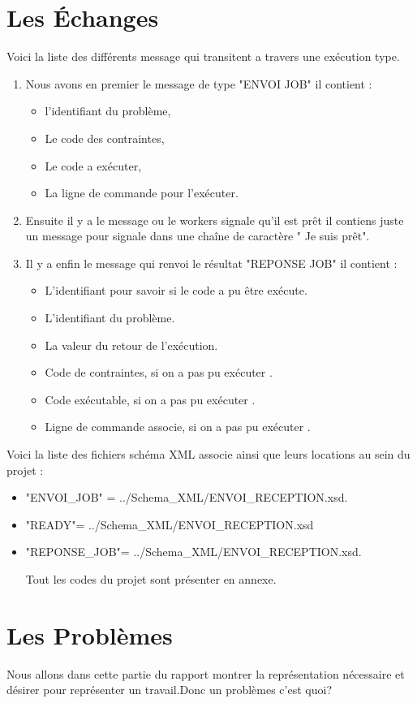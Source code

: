 \documentclass[11pt]{report}
\begin{document}
\chapter{Les Échanges} 
Voici la liste des différents message qui transitent a travers une exécution type.
\begin{enumerate} \item Nous avons en premier le message de type "ENVOI JOB" il contient :
\begin{itemize}
\item l'identifiant du problème,
\item Le code des contraintes,
\item Le code a exécuter,
\item La ligne de  commande pour l\textquoteright exécuter.
\end{itemize}
\item Ensuite il y a le message ou le workers signale qu'il est prêt il contiens juste un message pour signale dans une chaîne de caractère " Je suis prêt".
\item Il y a enfin le message qui renvoi le résultat "REPONSE JOB" il contient : 
\begin{itemize}
\item L'identifiant pour savoir si le code a pu être exécute.
\item L'identifiant du problème.
\item La valeur du retour de l\textquoteright exécution.
\item Code de contraintes, si on a pas pu exécuter .
\item Code exécutable, si on a pas pu exécuter .
\item Ligne de commande associe,  si on a pas pu exécuter .
\end{itemize}
\end{enumerate}
Voici la liste des fichiers schéma XML associe ainsi que leurs locations au sein du projet :
\begin{itemize}
\item "ENVOI\_JOB" = ../Schema\_XML/ENVOI\_RECEPTION.xsd.
\item "READY"= ../Schema\_XML/ENVOI\_RECEPTION.xsd 
\item "REPONSE\_JOB"= ../Schema\_XML/ENVOI\_RECEPTION.xsd.

Tout les codes du projet sont présenter en annexe.
\end{itemize}

\newpage
\chapter{Les Problèmes} 
Nous allons dans cette partie du rapport montrer la représentation nécessaire et désirer pour représenter un travail.Donc un problèmes c'est quoi? 
\end{document}
